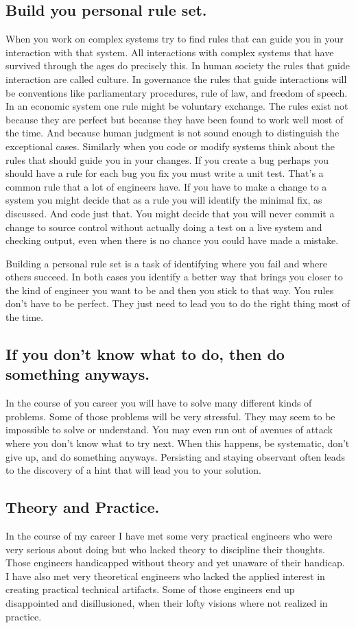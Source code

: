 \subsection{Build you personal rule set.}
When you work on complex systems try to find rules that can guide you in your interaction with that system. All interactions with complex systems
that have survived through the ages do precisely this. In human society the rules that guide interaction are called culture. In governance the
rules that guide interactions will be conventions like parliamentary procedures, rule of law, and freedom of speech. In an economic
system one rule might be voluntary exchange. The rules exist not because they are perfect but because they have been found to work well most
of the time. And because human judgment is not sound enough to distinguish the exceptional cases. Similarly when you code or modify systems think about the
rules that should guide you in your changes. If you create a bug perhaps you should have a rule for each bug you fix you must write a unit
test. That's a common rule that a lot of engineers have. If you have to make a change to a system you might decide that as a rule you will identify
the minimal fix, as discussed. And code just that. You might decide that you will never commit a change to source control without actually doing a
test on a live system and checking output, even when there is no chance you could have made a mistake.

Building a personal rule set is a task of identifying where you fail and where others succeed. In both cases you identify a better way that brings
you closer to the kind of engineer you want to be and then you stick to that way. You rules don't have to be perfect. They just need to lead you to do the
right thing most of the time. 

\subsection{If you don't know what to do, then do something anyways.}
In the course of you career you will have to solve many different kinds of problems. Some of those problems will be very stressful. They may
seem to be impossible to solve or understand. You may even run out of avenues of attack where you don't know what to try next. When this happens,
be systematic, don't give up, and do something anyways. Persisting and staying observant often leads to the discovery of a hint that will lead
you to your solution.

\subsection{Theory and Practice.}
In the course of my career I have met some very practical engineers who were very serious about doing but who lacked theory to
discipline their thoughts. Those engineers handicapped without theory and yet unaware of their handicap. I have also met very theoretical
engineers who lacked the applied interest in creating practical technical artifacts. Some of those engineers end up disappointed and disillusioned,
when their lofty visions where not realized in practice.

